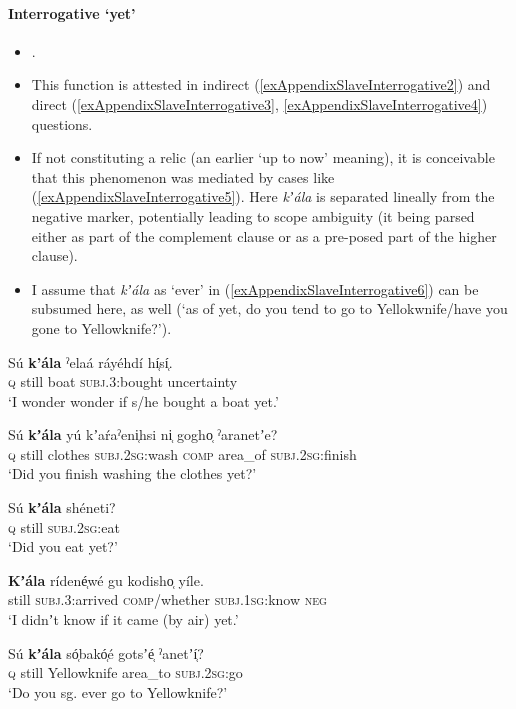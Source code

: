  \paragraph{Interrogative \lq yet\rq{}}
 \label{appendixSlaveInterrogativeYet}
 \begin{itemize}
 	\item \textcite[561]{Rice1978}. 
 	\item This function is attested in indirect (\ref{exAppendixSlaveInterrogative2}) and direct (\ref{exAppendixSlaveInterrogative3}, \ref{exAppendixSlaveInterrogative4}) questions.
	\item If not constituting a relic (an earlier \lq up to now\rq{ }meaning), it is conceivable that this phenomenon was mediated by cases like (\ref{exAppendixSlaveInterrogative5}). Here \textit{kʼála} is separated lineally from the negative marker, potentially leading to scope ambiguity (it being parsed either as part of the complement clause or as a pre-posed part of the higher clause). 
	\item I assume that \textit{kʼála} as \lq ever\rq{ }in (\ref{exAppendixSlaveInterrogative6}) can be subsumed here, as well (\lq as of yet, do you tend to go to Yellokwnife/have you gone to Yellowknife?\rq{}).
 \end{itemize}
 
 \begin{exe}

 	\ex\label{exAppendixSlaveInterrogative2}
	\gll Sú \textbf{k'ála} ˀelaá ráyéhdí hí̜sí̜.\\
	\textsc{q} still boat \textsc{subj}.3:bought uncertainty\\
	\glt \lq I wonder wonder if s/he bought a boat yet.' \parencite[421]{Rice1989}
	
 	\ex\label{exAppendixSlaveInterrogative3}
	\gll Sú \textbf{kʼála} yú kʼaŕaˀeni̜hsi ni̜ gogho̜ ˀaranetʼe?\\
	\textsc{q} still clothes \textsc{subj}.2\textsc{sg}:wash \textsc{comp} area\_of \textsc{subj}.2\textsc{sg}:finish\\
	\glt \lq Did you finish washing the clothes yet?' \parencite[1245]{Rice1989}
	
 	\ex\label{exAppendixSlaveInterrogative4}
	\gll Sú \textbf{kʼála} shéneti?\\
	\textsc{q} still \textsc{subj}.2\textsc{sg}:eat\\
	\glt \lq Did you eat yet?' \parencite[1989]{Rice1989}
	
	\ex\label{exAppendixSlaveInterrogative5}
	\gll \textbf{Kʼála} rídené̜wé gu kodisho̜ yíle.\\
	still \textsc{subj}.3:arrived \textsc{comp}/whether \textsc{subj}.1\textsc{sg}:know \textsc{neg}\\
	\glt \lq I didnʼt know if it came (by air) yet.' \parencite[1250]{Rice1989}
		
	\ex\label{exAppendixSlaveInterrogative6}
	\gll Sú	\textbf{kʼála}	só̜bakó̜é	gotsʼé̜		ˀanetʼí̜?\\
	\textsc{q} still Yellowknife	area\_to \textsc{subj}.2\textsc{sg}:go\\
	\glt \lq Do you sg. ever go to Yellowknife?\rq{ }\parencite[1133]{Rice1989}
 \end{exe}

